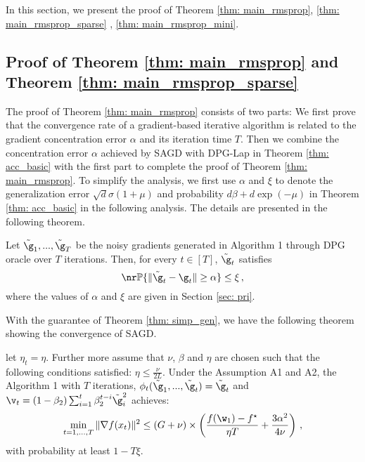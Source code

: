 
In this section, we present the proof of Theorem \ref{thm: main_rmsprop}, \ref{thm: main_rmsprop_sparse}
\label{sec: thm2_proof}, \ref{thm: main_rmsprop_mini}.

\subsection{Proof of Theorem \ref{thm: main_rmsprop} and Theorem \ref{thm: main_rmsprop_sparse}}

The proof of Theorem \ref{thm: main_rmsprop} consists of two parts: We first prove that the convergence rate of a gradient-based iterative algorithm is related to the gradient concentration error $\alpha$ and its iteration 
time $T$. Then we combine the concentration error $\alpha$ achieved by SAGD with DPG-Lap in Theorem \ref{thm: acc_basic} with the first part to complete the proof of Theorem \ref{thm: main_rmsprop}. 
To simplify the analysis, we first use $\alpha$ and $\xi$ to denote the generalization error $\sqrt{d} \sigma(1+\mu)$ and probability $d \beta+d \exp (-\mu)$ in Theorem \ref{thm: acc_basic} in the following analysis. The details are presented in the following theorem.
\begin{theo} \label{thm: simp_gen}
Let $\tilde \g_1,...,\tilde \g_T$ be the noisy gradients generated in Algorithm 1 through DPG oracle over $T$ iterations.
Then, for every $t \in [T]$, $\tilde \g_t$ satisfies
\begin{equation} \nr
    \mathbb{P}\{\|\tilde \g_t - \g_t\| \geq \alpha \} \leq \xi \, ,
\end{equation}
where the values of $\alpha$ and $\xi$ are given in Section \ref{sec: pri}. 
\end{theo}
With the guarantee of Theorem \ref{thm: simp_gen}, we have the following theorem showing the convergence of SAGD.
\begin{theo} \label{thm: opt_rmsprop}
 let $\eta_t = \eta$. Further more assume that $\nu$, $\beta$ and $\eta$ are chosen such that the following conditions satisfied: $\eta \leq \frac{\nu}{2L}$. 
 Under the Assumption A1 and A2, the Algorithm 1 with $T$ iterations, $\phi_t(\tilde \g_1,...,\tilde \g_t) = \tilde \g_t$ and $ \v_t = \left(1-\beta_{2}\right) \sum_{i=1}^{t} \beta_{2}^{t-i} \tilde \g_{i}^{2}$ achieves:
\begin{equation}\label{eq: opt_rmsprop}
 \min_{t = 1,..., T}\|\nabla f(x_t)\|^2 \leq
    \left(G+\nu \right) \times \left(   \frac{ f(\w_1) - f^\star}{\eta T} + \frac{3 \alpha^2}{4\nu}\right) \, ,
\end{equation}
with probability at least $1-T\xi$.
\end{theo}
